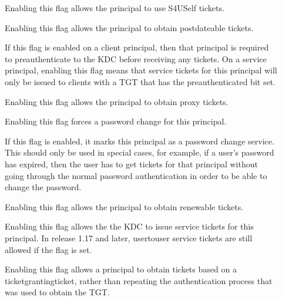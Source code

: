 \documentclass[letterpaper,10pt,english]{sphinxmanual}
\begin{document}
\begin{description}
\begin{description}
\item[{}] \leavevmode
\sphinxAtStartPar
Enabling this flag allows the principal to use S4USelf tickets.

\item[{}] \leavevmode
\sphinxAtStartPar
Enabling this flag allows the principal to obtain postdateable
tickets.

\item[{}] \leavevmode
\sphinxAtStartPar
If this flag is enabled on a client principal, then that
principal is required to preauthenticate to the KDC before
receiving any tickets.  On a service principal, enabling this
flag means that service tickets for this principal will only
be issued to clients with a TGT that has the preauthenticated
bit set.

\item[{}] \leavevmode
\sphinxAtStartPar
Enabling this flag allows the principal to obtain proxy
tickets.

\item[{}] \leavevmode
\sphinxAtStartPar
Enabling this flag forces a password change for this
principal.

\item[{}] \leavevmode
\sphinxAtStartPar
If this flag is enabled, it marks this principal as a password
change service.  This should only be used in special cases,
for example, if a user’s password has expired, then the user
has to get tickets for that principal without going through
the normal password authentication in order to be able to
change the password.

\item[{}] \leavevmode
\sphinxAtStartPar
Enabling this flag allows the principal to obtain renewable
tickets.

\item[{}] \leavevmode
\sphinxAtStartPar
Enabling this flag allows the the KDC to issue service tickets
for this principal.  In release 1.17 and later, user\sphinxhyphen{}to\sphinxhyphen{}user
service tickets are still allowed if the  flag is
set.

\item[{}] \leavevmode
\sphinxAtStartPar
Enabling this flag allows a principal to obtain tickets based
on a ticket\sphinxhyphen{}granting\sphinxhyphen{}ticket, rather than repeating the
authentication process that was used to obtain the TGT.


\end{description}
\end{description}
\end{document}
